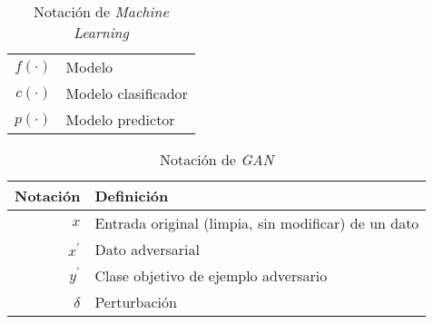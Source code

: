 \begin{table}[H]
\begin{center}
\begin{tabularx}{\textwidth}{|r|X|}
            $ f\left(\cdot\right) $                                                          & Modelo                                                                                                                                                                          \\
            $ {c}\left(\cdot\right) $                                                        & Modelo clasificador                                                                                                                                                             \\
            $ {p}\left(\cdot\right) $                                                        & Modelo predictor                                                                                                                                                                \\
            \hline
        \end{tabularx}
        \caption{Notación de \textit{Machine Learning}}
        \label{tab:notation-part-ml}
    \end{center}
\end{table}

\begin{table}[H]
    \begin{center}
        \begin{tabularx}{\textwidth}{|r|X|}
            \hline
            \textbf{Notación} & \textbf{Definición}                                 \\
            \hline %
            $ x $             & Entrada original (limpia, sin modificar) de un dato \\
            $ x^{\prime} $    & Dato adversarial                                    \\
            $ y^{\prime} $    & Clase objetivo de ejemplo adversario                \\
            $ \delta $        & Perturbación                                        \\

            \hline
        \end{tabularx}
        \caption{Notación de \textit{GAN}}
        \label{tab:notation-part-gans}
    \end{center}
\end{table}



